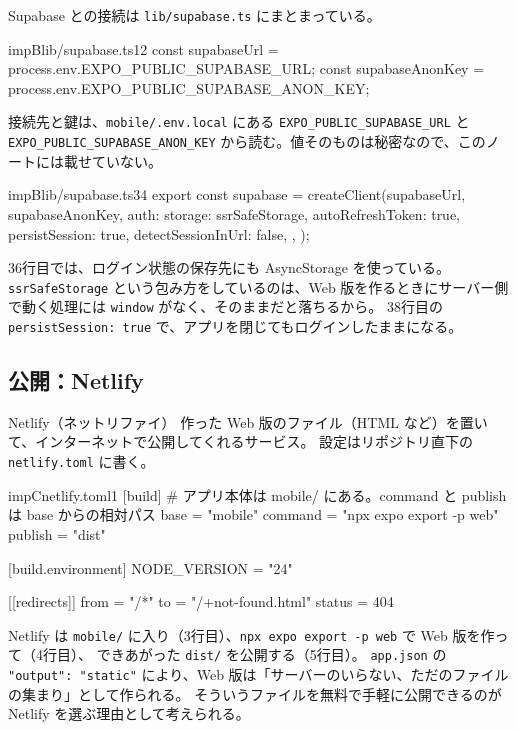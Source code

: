 Supabase との接続は \texttt{lib/supabase.ts} にまとまっている。

\begin{codebox}{impB}{lib/supabase.ts}{12}
const supabaseUrl = process.env.EXPO_PUBLIC_SUPABASE_URL;
const supabaseAnonKey = process.env.EXPO_PUBLIC_SUPABASE_ANON_KEY;
\end{codebox}

接続先と鍵は、\texttt{mobile/.env.local} にある \texttt{EXPO\_PUBLIC\_SUPABASE\_URL} と
\texttt{EXPO\_PUBLIC\_SUPABASE\_ANON\_KEY} から読む。値そのものは秘密なので、このノートには載せていない。

\begin{codebox}{impB}{lib/supabase.ts}{34}
export const supabase = createClient(supabaseUrl, supabaseAnonKey, {
  auth: {
    storage: ssrSafeStorage,
    autoRefreshToken: true,
    persistSession: true,
    detectSessionInUrl: false,
  },
});
\end{codebox}

36行目では、ログイン状態の保存先にも AsyncStorage を使っている。
\texttt{ssrSafeStorage} という包み方をしているのは、Web 版を作るときにサーバー側で動く処理には \texttt{window} がなく、そのままだと落ちるから。\evCode
38行目の \texttt{persistSession: true} で、アプリを閉じてもログインしたままになる。

\subsection{公開：Netlify}

\begin{kkbadgepoint}[定義]{Netlify（ネットリファイ）}
  作った Web 版のファイル（HTML など）を置いて、インターネットで公開してくれるサービス。
  設定はリポジトリ直下の \texttt{netlify.toml} に書く。
\end{kkbadgepoint}

\begin{codebox}[language=plain]{impC}{netlify.toml}{1}
[build]
  # アプリ本体は mobile/ にある。command と publish は base からの相対パス
  base = "mobile"
  command = "npx expo export -p web"
  publish = "dist"

[build.environment]
  NODE_VERSION = "24"

[[redirects]]
  from = "/*"
  to = "/+not-found.html"
  status = 404
\end{codebox}

Netlify は \texttt{mobile/} に入り（3行目）、\texttt{npx expo export -p web} で Web 版を作って（4行目）、
できあがった \texttt{dist/} を公開する（5行目）。
\texttt{app.json} の \texttt{"output": "static"} により、Web 版は「サーバーのいらない、ただのファイルの集まり」として作られる。\evCode
そういうファイルを無料で手軽に公開できるのが Netlify を選ぶ理由として考えられる。\evGuess

